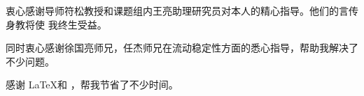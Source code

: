 \begin{acknowledgement}
  衷心感谢导师符松教授和课题组内王亮助理研究员对本人的精心指导。他们的言传身教将使
  我终生受益。

  同时衷心感谢徐国亮师兄，任杰师兄在流动稳定性方面的悉心指导，帮助我解决了不少问题。

  感谢 \LaTeX 和 \thuthesis\cite{thuthesis}，帮我节省了不少时间。
\end{acknowledgement}
